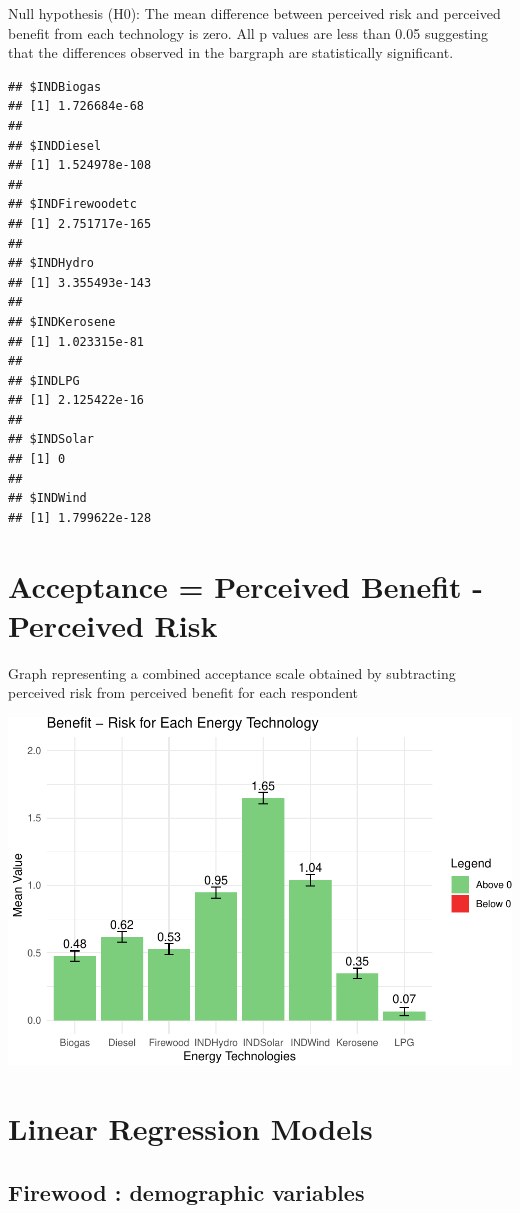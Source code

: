 \documentclass[
]{article}
\begin{document}
Null hypothesis (H0): The mean difference between perceived risk and
perceived benefit from each technology is zero. All p values are less
than 0.05 suggesting that the differences observed in the bargraph are
statistically significant.

\begin{verbatim}
## $INDBiogas
## [1] 1.726684e-68
## 
## $INDDiesel
## [1] 1.524978e-108
## 
## $INDFirewoodetc
## [1] 2.751717e-165
## 
## $INDHydro
## [1] 3.355493e-143
## 
## $INDKerosene
## [1] 1.023315e-81
## 
## $INDLPG
## [1] 2.125422e-16
## 
## $INDSolar
## [1] 0
## 
## $INDWind
## [1] 1.799622e-128
\end{verbatim}

\hypertarget{acceptance-perceived-benefit---perceived-risk}{%
\section{Acceptance = Perceived Benefit - Perceived
Risk}\label{acceptance-perceived-benefit---perceived-risk}}

Graph representing a combined acceptance scale obtained by subtracting
perceived risk from perceived benefit for each respondent

\includegraphics{LPGversusFirewood_files/figure-latex/unnamed-chunk-10-1.pdf}
\newpage

\hypertarget{linear-regression-models}{%
\section{Linear Regression Models}\label{linear-regression-models}}

\hypertarget{firewood-demographic-variables}{%
\subsection{Firewood : demographic
variables}\label{firewood-demographic-variables}}
\end{document}
